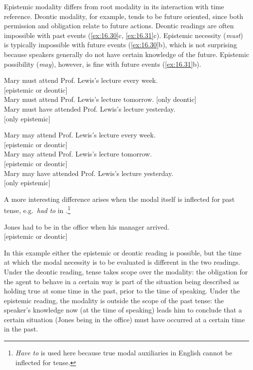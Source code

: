 Epistemic modality differs from root modality in its interaction with time reference. Deontic modality, for example, tends to be future oriented, since both permission and obligation relate to future actions. Deontic readings are often impossible with past events (\ref{ex:16.30}c, \ref{ex:16.31}c).  Epistemic necessity (\textit{must}) is typically impossible with future events (\ref{ex:16.30}b), which is not surprising because speakers generally do not have certain knowledge of the future. Epistemic possibility (\textit{may}), however, is fine with future events (\ref{ex:16.31}b). 


\ea \label{ex:16.30}
\ea  Mary must attend Prof. Lewis’s lecture every week. \\ \hfill [epistemic or deontic]\\
\ex Mary must attend Prof. Lewis’s lecture tomorrow.                  \hfill [only deontic]\\
\ex Mary must have attended Prof. Lewis’s lecture yesterday. \\  \hfill [only epistemic]
                       \z
\z

\ea \label{ex:16.31}
\ea  Mary may attend Prof. Lewis’s lecture every week. \\ \hfill [epistemic or deontic]\\
\ex Mary may attend Prof. Lewis’s lecture tomorrow.  \\  \hfill [epistemic or deontic]\\
\ex Mary may have attended Prof. Lewis’s lecture yesterday. \\  \hfill [only epistemic]
                       \z
\z


A more interesting difference arises when the modal itself is inflected for past tense, e.g.~\textit{had to} in .\footnote{\textit{Have to} is used here because true modal auxiliaries in English cannot be inflected for tense.}


\ea \label{ex:16.32}
Jones had to be in the office when his manager arrived. \\ \hfill [epistemic or deontic]
\z

In this example either the epistemic or deontic reading is possible, but the time at which the modal necessity is to be evaluated is different in the two readings. Under the deontic reading, tense takes scope over the modality: the obligation for the agent to behave in a certain way is part of the situation being described as holding true at some time in the past, prior to the time of speaking. Under the epistemic reading, the modality is outside the scope of the past tense: the speaker’s knowledge now (at the time of speaking) leads him to conclude that a certain situation (Jones being in the office) must have occurred at a certain time in the past.


